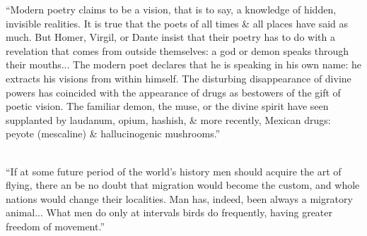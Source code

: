 ``Modern poetry claims to be a vision, that is to say, a knowledge of hidden, invisible realities. It is true that the poets of all times \& all places have said as much. But Homer, Virgil, or Dante insist that their poetry has to do with a revelation that comes from outside themselves: a god or demon speaks through their mouths... The modern poet declares that he is speaking in his own name: he extracts his visions from within himself. The disturbing disappearance of divine powers has coincided with the appearance of drugs as bestowers of the gift of poetic vision. The familiar demon, the muse, or the divine spirit have seen supplanted by laudanum, opium, hashish, \& more recently, Mexican drugs: peyote (mescaline) \& hallucinogenic mushrooms.'' \\
\\
\vspace{2em}

``If at some future period of the world's history men should acquire the art of flying, there an be no doubt that migration would become the custom, and whole nations would change their localities.  Man has, indeed, been always a migratory animal... What men do only at intervals birds do frequently, having greater freedom of movement.''
\\
